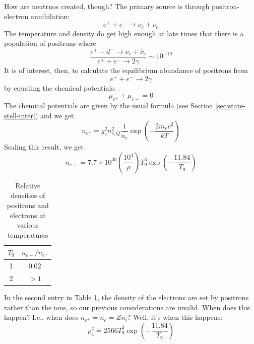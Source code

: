 \documentclass[10pt]{article}
\numberwithin{equation}{section}
\newcommand{\n}{\noindent}
\begin{document}
    \n How are neutrnos created, though? The primary source is through
    positron-electron annihilation:
    \begin{equation}
      \label{eq:342}
      e^++e^-\to\nu_e+\overline{\nu}_e
    \end{equation}
    The temperature and density do get high enough at late times that
    there is a population of positrons where
    \begin{equation}
      \label{eq:343}
      \frac{e^++d^-\to \nu_e+\overline{\nu}_e}{e^++e^-\to 2\gamma}\sim 10^
{-19}
    \end{equation}
    It is of interest, then, to calculate the equilibrium abundance of
    positrons from
    \begin{equation}
      \label{eq:344}
      e^++e^-\to 2\gamma
    \end{equation}
    by equating the chemical potentials:
    \begin{equation}
      \label{eq:345}
      \mu_{e^+}+\mu_{e-}=0
    \end{equation}
    The chemical potentials are given by the usual formula (see Section
    \ref{sec:state-stell-inter}) and we get
    \begin{equation}
      \label{eq:346}
      n_{e^+}=g_e^2n_{e,Q}^2\frac{1}{n_e}\exp\left(-\frac{2m_e c^2}{kT}
\right)
    \end{equation}
    Scaling this result, we get
    \begin{equation}
      \label{eq:347}
      n_{e+}=7.7\times 10^{30}\left(\frac{10^4}{\rho}\right)T_9^3\exp\left
(-\frac{11.84}{T_9}\right)
    \end{equation}
    \begin{table}[h]
      \centering
      \begin{tabular}{c c}
        $T_9$ & $n_{e+}/n_{e^-}$\\
        \hline \hline
        1 & 0.02\\
        2 & $>1$
      \end{tabular}
      \caption{Relative densities of positrons and electrons at various 
temperatures}
      \label{tab:positron}
    \end{table}
    In the second entry in Table \ref{tab:positron}, the density of
    the electrons are set by positrons rather than the ions, so our
    previous considerations are invalid. When does this happen?
    I.e., when does $n_{e^+}=n_e=Zn_i$? Well, it's when this
    happens:
    \begin{equation}
      \label{eq:348}
      \rho_4^2=2566 T_9^3\exp\left(-\frac{11.84}{T_9}\right)
    \end{equation}
\end{document}
